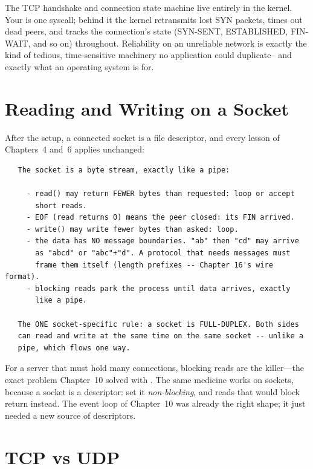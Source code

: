 \begin{osconcept}
The TCP handshake and connection state machine live entirely in the
kernel. Your  is one syscall; behind it the kernel
retransmits lost SYN packets, times out dead peers, and tracks the
connection's state (SYN-SENT, ESTABLISHED, FIN-WAIT, and so on)
throughout. Reliability on an unreliable network is exactly the kind
of tedious, time-sensitive machinery no application could duplicate--
and exactly what an operating system is for.
\end{osconcept}

\section{Reading and Writing on a Socket}

After the setup, a connected socket is a file descriptor, and every
lesson of Chapters~4 and~6 applies unchanged:

\begin{verbatim}
   The socket is a byte stream, exactly like a pipe:

     - read() may return FEWER bytes than requested: loop or accept
       short reads.
     - EOF (read returns 0) means the peer closed: its FIN arrived.
     - write() may write fewer bytes than asked: loop.
     - the data has NO message boundaries. "ab" then "cd" may arrive
       as "abcd" or "abc"+"d". A protocol that needs messages must
       frame them itself (length prefixes -- Chapter 16's wire format).
     - blocking reads park the process until data arrives, exactly
       like a pipe.

   The ONE socket-specific rule: a socket is FULL-DUPLEX. Both sides
   can read and write at the same time on the same socket -- unlike a
   pipe, which flows one way.
\end{verbatim}

For a server that must hold many connections, blocking reads are the
killer---the exact problem Chapter~10 solved with . The same
medicine works on sockets, because a socket is a descriptor: set it
\emph{non-blocking}, and reads that would block return 
instead. The event loop of Chapter~10 was already the right shape; it
just needed a new source of descriptors.

\section{TCP vs UDP}

